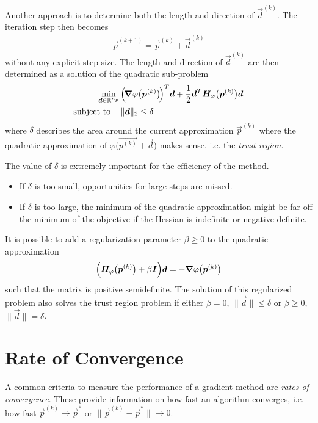 		Another approach is to determine both the length and direction of \( \vec{d}^{(k)} \). The iteration step then becomes
		\begin{align*}
			\vec{p}^{(k + 1)} = \vec{p}^{(k)} + \vec{d}^{(k)}
		\end{align*}
		without any explicit step size. The length and direction of \( \vec{d}^{(k)} \) are then determined as a solution of the quadratic sub-problem
		\begin{align*}
			\min_{\bm{d} \in \mathbb{R}^{n_p}} &\, \Big(\! \grad{\varphi}\big(\bm{p}^{(k)}\big) \!\Big)^T \bm{d} + \frac{1}{2} \bm{d}^T \bm{H}_\varphi\big(\bm{p}^{(k)}\big) \bm{d} \\
			\mathrm{subject~to}\quad &\,
				\begin{alignedat}[t]{2}
					\lVert \bm{d} \rVert_2 & \leq \delta
				\end{alignedat}
		\end{align*}
		where \(\delta\) describes the area around the current approximation \( \vec{p}^{(k)} \) where the quadratic approximation of \( \varphi\big(\vec{p^{(k)}} + \vec{d}\big) \) makes sense, i.e. the \emph{trust region}.

		The value of \(\delta\) is extremely important for the efficiency of the method.
		\begin{itemize}
			\item If \(\delta\) is too small, opportunities for large steps are missed.
			\item If \(\delta\) is too large, the minimum of the quadratic approximation might be far off the minimum of the objective if the Hessian is indefinite or negative definite.
		\end{itemize}
		It is possible to add a regularization parameter \(\beta \geq 0\) to the quadratic approximation
		\begin{align*}
			\Big( \bm{H}_\varphi\big(\bm{p}^{(k)}\big) + \beta \bm{I} \Big) \bm{d} = -\grad{\varphi}\big(\bm{p}^{(k)}\big)
		\end{align*}
		such that the matrix is positive semidefinite. The solution of this regularized problem also solves the trust region problem if either \( \beta = 0 \), \( \lVert \vec{d} \rVert \leq \delta \) or \( \beta \geq 0 \), \( \lVert \vec{d} \rVert = \delta \).

	\section{Rate of Convergence}
		A common criteria to measure the performance of a gradient method are \emph{rates of convergence}. These provide information on how fast an algorithm converges, i.e. how fast \( \vec{p}^{(k)} \to \vec{p}^\ast \) or \( \big\lVert \vec{p}^{(k)} - \vec{p}^\ast \big\rVert \to 0 \).

